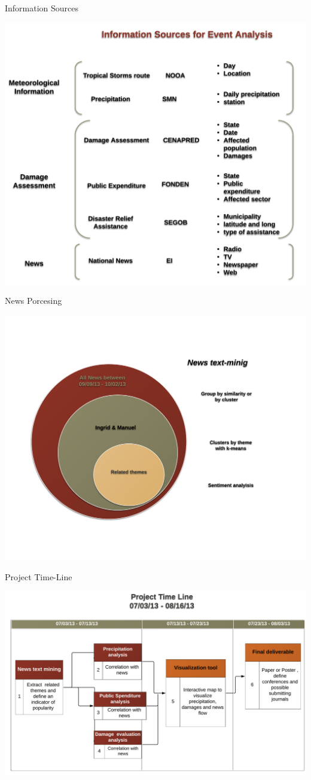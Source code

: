 \documentclass[ignorenonframetext,]{beamer}
\begin{document}
\begin{frame}{Information Sources}

\includegraphics{img/sources.png}

\end{frame}

\begin{frame}{News Porcesing}

\includegraphics{img/news.png}

\end{frame}

\begin{frame}{Project Time-Line}

\includegraphics{img/p_tl.png}

\end{frame}
\end{document}
